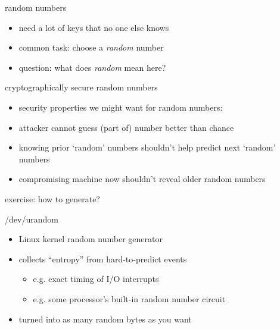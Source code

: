 \begin{frame}{random numbers}
    \begin{itemize}
    \item need a lot of keys that no one else knows
    \vspace{.5cm}
    \item common task: choose a \textit{random} number
    \item question: what does \textit{random} mean here?
    \end{itemize}
\end{frame}

\begin{frame}{cryptographically secure random numbers}
    \begin{itemize}
        \item security properties we might want for random numbers:
        \vspace{.5cm}
    \item attacker cannot guess (part of) number better than chance
    \item knowing prior `random' numbers shouldn't help predict next `random' numbers
    \item compromising machine now shouldn't reveal older random numbers
    \end{itemize}
\end{frame}

\begin{frame}{exercise: how to generate?}
\end{frame}

\begin{frame}{/dev/urandom}
    \begin{itemize}
    \item Linux kernel random number generator
    \vspace{.5cm}
    \item collects ``entropy'' from hard-to-predict events
        \begin{itemize}
        \item e.g. exact timing of I/O interrupts
        \item e.g. some processor's built-in random number circuit
        \end{itemize}
    \item turned into as many random bytes as you want
    \end{itemize}
\end{frame}

